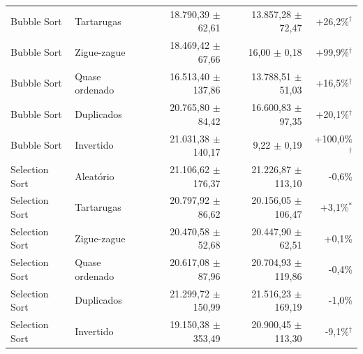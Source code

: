 \begin{tabular}{llrrr}
Bubble Sort & Tartarugas & 18.790,39 $\pm$ 62,61 & 13.857,28 $\pm$ 72,47 & +26,2\%$^{\dagger}$ \\
Bubble Sort & Zigue-zague & 18.469,42 $\pm$ 67,66 & 16,00 $\pm$ 0,18 & +99,9\%$^{\dagger}$ \\
Bubble Sort & Quase ordenado & 16.513,40 $\pm$ 137,86 & 13.788,51 $\pm$ 51,03 & +16,5\%$^{\dagger}$ \\
Bubble Sort & Duplicados & 20.765,80 $\pm$ 84,42 & 16.600,83 $\pm$ 97,35 & +20,1\%$^{\dagger}$ \\
Bubble Sort & Invertido & 21.031,38 $\pm$ 140,17 & 9,22 $\pm$ 0,19 & +100,0\%$^{\dagger}$ \\
Selection Sort & Aleatório & 21.106,62 $\pm$ 176,37 & 21.226,87 $\pm$ 113,10 & -0,6\% \\
Selection Sort & Tartarugas & 20.797,92 $\pm$ 86,62 & 20.156,05 $\pm$ 106,47 & +3,1\%$^{*}$ \\
Selection Sort & Zigue-zague & 20.470,58 $\pm$ 52,68 & 20.447,90 $\pm$ 62,51 & +0,1\% \\
Selection Sort & Quase ordenado & 20.617,08 $\pm$ 87,96 & 20.704,93 $\pm$ 119,86 & -0,4\% \\
Selection Sort & Duplicados & 21.299,72 $\pm$ 150,99 & 21.516,23 $\pm$ 169,19 & -1,0\% \\
Selection Sort & Invertido & 19.150,38 $\pm$ 353,49 & 20.900,45 $\pm$ 113,30 & -9,1\%$^{\dagger}$ \\
\hline
\end{tabular}
